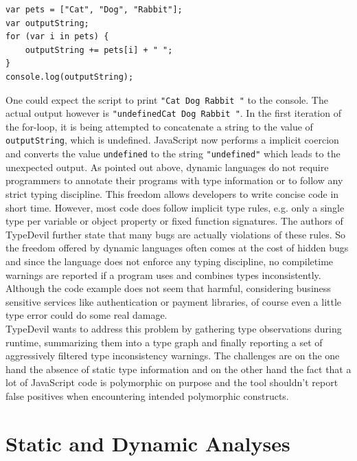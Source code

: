 \documentclass[runningheads,a4paper]{llncs}
\begin{document}
\medskip\medskip
\lstset{language=javascript}
\begin{minipage}{\textwidth}
\begin{lstlisting}[frame=single, caption=Implicit Coercions, label={listingPets}] 
var pets = ["Cat", "Dog", "Rabbit"];
var outputString;
for (var i in pets) {
    outputString += pets[i] + " ";
}
console.log(outputString);
\end{lstlisting}
\end{minipage}
One could expect the script to print \lstinline[columns=fixed]{"Cat Dog Rabbit "} to the console.
The actual output however is \lstinline[columns=fixed]{"undefinedCat Dog Rabbit "}. 
In the first iteration of the for-loop, it is being attempted to concatenate a string to the value of \lstinline[columns=fixed]{outputString}, which is undefined. 
JavaScript now performs a implicit coercion and converts the value \lstinline[columns=fixed]{undefined} to the string \lstinline[columns=fixed]{"undefined"} which leads to the unexpected output.
As pointed out above, dynamic languages do not require programmers to annotate their programs with type information or to follow any strict typing discipline. 
This freedom allows developers to write concise code in short time. 
However, most code does follow implicit type rules, e.g. only a single type per variable or object property or fixed function signatures.
The authors of TypeDevil further state that many bugs are actually violations of these rules.
So the freedom offered by dynamic languages often comes at the cost of hidden bugs and since the language does not enforce any typing discipline, no compiletime warnings are reported if a program uses and combines types inconsistently.
Although the code example does not seem that harmful, considering business sensitive services like authentication or payment libraries, of course even a little type error could do some real damage. \\
TypeDevil wants to address this problem by gathering type observations during runtime, summarizing them into a type graph and finally reporting a set of aggressively filtered type inconsistency warnings.
The challenges are on the one hand the absence of static type information and on the other hand the fact that a lot of JavaScript code is polymorphic on purpose and the tool shouldn't report false positives when encountering intended polymorphic constructs.

\section{Static and Dynamic Analyses} \label{staticDynamicAnalysis}
\end{document}
